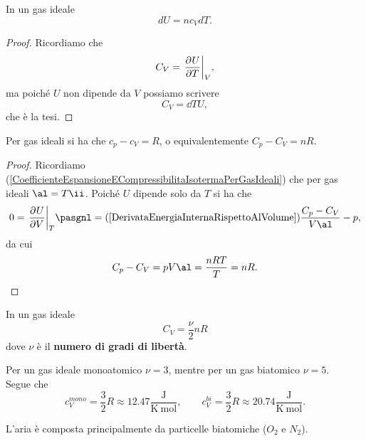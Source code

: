 \begin{corollary}
In un gas ideale
\[dU=nc_V dT.\]
\end{corollary}
\begin{proof}
Ricordiamo che
\[C_V=\ppb TUV,\]
ma poich\'e $U$ non dipende da $V$ possiamo scrivere
\[C_V=\dd TU,\]
che \`e la tesi.
\end{proof}

\begin{proposition}\label{RelazioneMayer}
Per gas ideali si ha che $c_p-c_V=R$, o equivalentemente $C_p-C_V=nR$.
\end{proposition}
\begin{proof}
Ricordiamo (\ref{CoefficienteEspansioneECompressibilitaIsotermaPerGasIdeali}) che per gas ideali $\al=T\ii$. Poich\'e $U$ dipende solo da $T$ si ha che
\[0=\ppb VUT\pasgnl={(\ref{DerivataEnergiaInternaRispettoAlVolume})}\frac{C_p-C_V}{V\al}-p,\]
da cui
\[C_p-C_V=pV\al=\frac{nRT}T=nR.\]
\end{proof}



\begin{fact}
In un gas ideale
\[C_V=\frac\nu2nR\]
dove $\nu$ \`e il \textbf{numero di gradi di libert\`a}.
\end{fact}
\begin{remark}
Per un gas ideale monoatomico $\nu=3$, mentre per un gas biatomico $\nu=5$.\\
Segue che
\[c_V^{mono}=\frac32R\approx 12.47\frac{\mathrm{J}}{\mathrm{K\ mol}},\qquad c_V^{bi}=\frac32R\approx 20.74\frac{\mathrm{J}}{\mathrm{K\ mol}}.\]
\end{remark}

\begin{remark}
L'aria \`e composta principalmente da particelle biatomiche ($O_2$ e $N_2$).
\end{remark}

